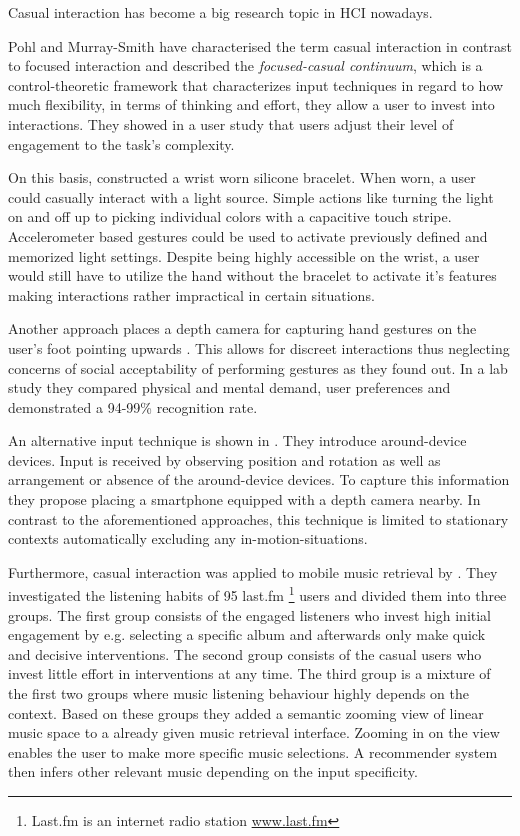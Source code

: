 Casual interaction has become a big research topic in \ac{HCI} nowadays.

Pohl and Murray-Smith \cite{pohl2013focused} have characterised the term casual interaction in contrast to focused interaction and described the \textit{focused-casual continuum}, which is a control-theoretic framework that characterizes input techniques in regard to how much flexibility, in terms of thinking and effort, they allow a user to invest into interactions. They showed in a user study that users adjust their level of engagement to the task's complexity.

On this basis, \cite{Busse2014Thesis} constructed a wrist worn silicone bracelet. When worn, a user could casually interact with a light source. Simple actions like turning the light on and off up to picking individual colors with a capacitive touch stripe. Accelerometer based gestures could be used to activate previously defined and memorized light settings. Despite being highly accessible on the wrist, a user would still have to utilize the hand without the bracelet to activate it's features making interactions rather impractical in certain situations.

Another approach places a depth camera for capturing hand gestures on the user's foot pointing upwards \cite{bailly2012shoesense}. This allows for discreet interactions thus neglecting concerns of social acceptability of performing gestures as they found out. In a lab study they compared physical and mental demand, user preferences and demonstrated a 94-99\% recognition rate.

An alternative input technique is shown in \cite{pohl2014around}. They introduce around-device devices. Input is received by observing position and rotation as well as arrangement or absence of the around-device devices. To capture this information they propose placing a smartphone equipped with a depth camera nearby.  In contrast to the aforementioned approaches, this technique is limited to stationary contexts automatically excluding any in-motion-situations.

Furthermore, casual interaction was applied to mobile music retrieval by \cite{boland2015engaging}. They investigated the listening habits of 95 last.fm \footnote{Last.fm is an internet radio station \url{www.last.fm}} users and divided them into three groups. The first group consists of the engaged listeners who invest high initial engagement by e.g. selecting a specific album and afterwards only make quick and decisive interventions. The second group consists of the casual users who invest little effort in interventions at any time. The third group is a mixture of the first two groups where music listening behaviour highly depends on the context. Based on these groups they added a semantic zooming view of linear music space to a already given music retrieval interface. Zooming in on the view enables the user to make more specific music selections. A recommender system then infers other relevant music depending on the input specificity.







